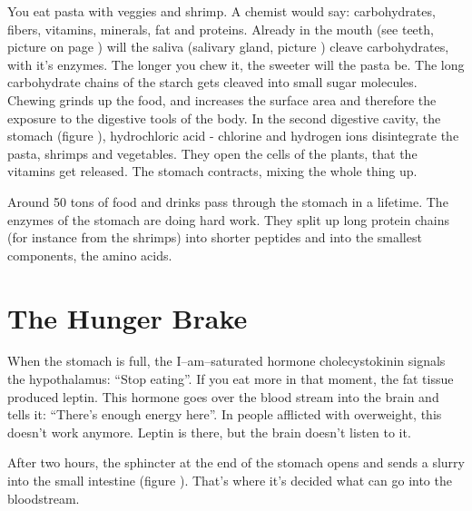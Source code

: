 \documentclass[../main.tex]{subfiles}
\begin{document}
You eat pasta with veggies and shrimp.
A chemist would say: carbohydrates, fibers, vitamins, minerals, fat and proteins.
Already in the mouth (see teeth, picture %
on page %
)
will the saliva (salivary gland, picture %
) cleave carbohydrates, with it's enzymes.
The longer you chew it, the sweeter will the pasta be.
The long carbohydrate chains of the starch gets cleaved into small sugar molecules.
Chewing grinds up the food, and increases the surface area and therefore the exposure to the digestive tools of the body. 
In the second digestive cavity, the stomach (figure %
), hydrochloric acid - chlorine and hydrogen ions disintegrate the pasta, shrimps and vegetables.
They open the cells of the plants, that the vitamins get released.
The stomach contracts, mixing the whole thing up.

Around 50 tons of food and drinks pass through the stomach in a lifetime.
The enzymes of the stomach are doing hard work.
They split up long protein chains (for instance from the shrimps) into shorter
peptides and into the smallest components, the amino acids.

\section{The Hunger Brake}

When the stomach is full, the I--am--saturated hormone cholecystokinin signals the hypothalamus: ``Stop eating''.
If you eat more in that moment, the fat tissue produced leptin.
This hormone goes over the blood stream into the brain and tells it: ``There's enough energy here''.
In people afflicted with overweight, this doesn't work anymore.
Leptin is there, but the brain doesn't listen to it.

After two hours, the sphincter at the end of the stomach opens and sends a slurry into the small intestine (figure %
).
That's where it's decided what can go into the bloodstream.

\end{document}
